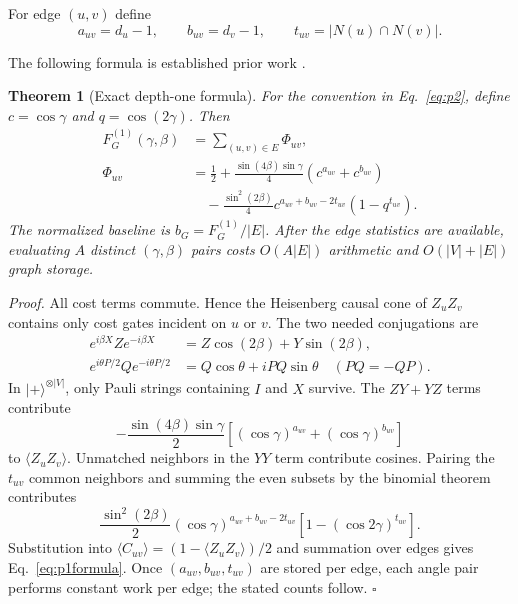 \documentclass[10pt,letterpaper,twoside]{article}
\newtheorem{theorem}{Theorem}
\begin{document}
For edge $(u,v)$ define
\begin{equation}
 a_{uv}=d_u-1,\qquad b_{uv}=d_v-1,\qquad
 t_{uv}=|N(u)\cap N(v)|.
\end{equation}

The following formula is established prior work \cite{wang2018fermionic}.

\begin{theorem}[Exact depth-one formula]
For the convention in Eq.~\eqref{eq:p2}, define
$c=\cos\gamma$ and $q=\cos(2\gamma)$.  Then
\begin{align}
F_G^{(1)}(\gamma,\beta)&=\sum_{(u,v)\in E}\Phi_{uv},\\
\Phi_{uv}&=\frac12+\frac{\sin(4\beta)\sin\gamma}{4}
\left(c^{a_{uv}}+c^{b_{uv}}\right)\nonumber\\
&\quad-\frac{\sin^2(2\beta)}{4}
c^{a_{uv}+b_{uv}-2t_{uv}}(1-q^{t_{uv}}).
\label{eq:p1formula}
\end{align}
The normalized baseline is $b_G=F_G^{(1)}/|E|$.
After the edge statistics are available, evaluating $A$ distinct
$(\gamma,\beta)$ pairs costs $O(A|E|)$ arithmetic and
$O(|V|+|E|)$ graph storage.
\end{theorem}

\noindent\textit{Proof.}
All cost terms commute.  Hence the Heisenberg causal cone of $Z_uZ_v$
contains only cost gates incident on $u$ or $v$.  The two needed conjugations
are
\begin{align}
e^{i\beta X}Ze^{-i\beta X}&=Z\cos(2\beta)+Y\sin(2\beta),\\
e^{i\theta P/2}Qe^{-i\theta P/2}
&=Q\cos\theta+iPQ\sin\theta
\quad(PQ=-QP).
\end{align}
In $|+\rangle^{\otimes |V|}$, only Pauli strings containing $I$ and $X$
survive.  The $ZY+YZ$ terms contribute
\begin{equation}
-\frac{\sin(4\beta)\sin\gamma}{2}
\left[(\cos\gamma)^{a_{uv}}+(\cos\gamma)^{b_{uv}}\right]
\end{equation}
to $\langle Z_uZ_v\rangle$.  Unmatched neighbors in the $YY$ term contribute
cosines.  Pairing the $t_{uv}$ common neighbors and summing the even subsets
by the binomial theorem contributes
\begin{equation}
\frac{\sin^2(2\beta)}{2}
(\cos\gamma)^{a_{uv}+b_{uv}-2t_{uv}}
\left[1-(\cos2\gamma)^{t_{uv}}\right].
\end{equation}
Substitution into
$\langle C_{uv}\rangle=(1-\langle Z_uZ_v\rangle)/2$ and summation over
edges gives Eq.~\eqref{eq:p1formula}.  Once $(a_{uv},b_{uv},t_{uv})$ are
stored per edge, each angle pair performs constant work per edge; the stated
counts follow. \hfill$\square$
\end{document}
